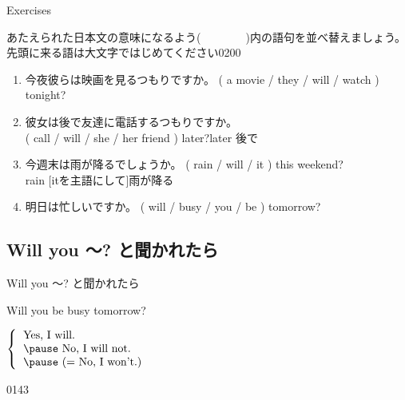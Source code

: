 \documentclass[aspectratio=169,xcolor={dvipsnames,table}]{beamer}
\newcommand{\myaudio}[1]{\href{#1}{\faVolumeUp}}
\begin{document}
\begin{frame}[plain]{Exercises}

{\small あたえられた日本文の意味になるよう(~~~~~~~~)内の語句を並べ替えましょう。
先頭に来る語は大文字ではじめてください}\mbox{}\hfill{\tiny 0200}\,{\scriptsize \myaudio{./audio/012_will_07.mp3}}

\begin{enumerate}
 \item 今夜彼らは映画を見るつもりですか。
 ( a movie / they / will / watch ) tonight?  \\
 \item 彼女は後で友達に電話するつもりですか。\\
 ( call / will / she / her friend ) later?\hfill{\scriptsize later  後で} \\
 \item 今週末は雨が降るでしょうか。
 ( rain / will / it ) this weekend?\\
 \hfill{\scriptsize rain   [itを主語にして]雨が降る}
 \item 明日は忙しいですか。
 ( will / busy  / you / be ) tomorrow?  \\
\end{enumerate}
 \end{frame}

\subsection{Will you 〜? と聞かれたら}
\begin{frame}[plain]{Will you 〜? と聞かれたら}
 \Large

Will you be busy tomorrow?

\vspace{20pt}
\pause

\mbox{}\hspace{100pt}$\left\{\begin{tabular}{l}
         \text{Yes, I will.}\\\pause
         \text{No, I will not.}\\\pause
         \text{(}= \text{No, I won't.)}
        \end{tabular}\right.$

\mbox{}\hfill{\tiny 0143}\,{\scriptsize \myaudio{./audio/012_will_08.mp3}}
\end{frame}
\end{document}
